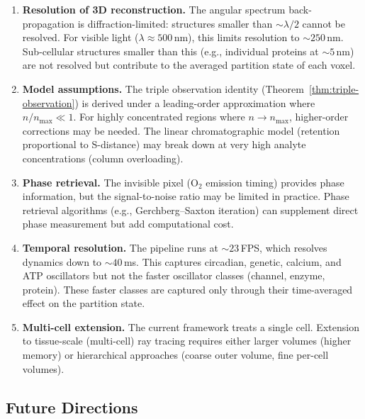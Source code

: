\documentclass[11pt,twocolumn,a4paper]{article}
\begin{document}
\begin{enumerate}[leftmargin=*,itemsep=2pt]
\item \textbf{Resolution of 3D reconstruction.} The angular spectrum
  back-propagation is diffraction-limited: structures smaller than
  $\sim\!\lambda/2$ cannot be resolved. For visible light ($\lambda
  \approx 500$\,nm), this limits resolution to $\sim\!250$\,nm.
  Sub-cellular structures smaller than this (e.g., individual proteins
  at $\sim\!5$\,nm) are not resolved but contribute to the averaged
  partition state of each voxel.

\item \textbf{Model assumptions.} The triple observation identity
  (Theorem~\ref{thm:triple-observation}) is derived under a
  leading-order approximation where $n/n_{\max} \ll 1$. For highly
  concentrated regions where $n \to n_{\max}$, higher-order
  corrections may be needed. The linear chromatographic model
  (retention proportional to S-distance) may break down at very high
  analyte concentrations (column overloading).

\item \textbf{Phase retrieval.} The invisible pixel (O$_2$ emission
  timing) provides phase information, but the signal-to-noise ratio
  may be limited in practice. Phase retrieval algorithms (e.g.,
  Gerchberg--Saxton iteration) can supplement direct phase measurement
  but add computational cost.

\item \textbf{Temporal resolution.} The pipeline runs at
  $\sim\!23$\,FPS, which resolves dynamics down to $\sim\!40$\,ms.
  This captures circadian, genetic, calcium, and ATP oscillators but
  not the faster oscillator classes (channel, enzyme, protein). These
  faster classes are captured only through their time-averaged effect
  on the partition state.

\item \textbf{Multi-cell extension.} The current framework treats a
  single cell. Extension to tissue-scale (multi-cell) ray tracing
  requires either larger volumes (higher memory) or hierarchical
  approaches (coarse outer volume, fine per-cell volumes).
\end{enumerate}

\subsection{Future Directions}
\end{document}
